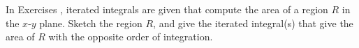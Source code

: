 {\noindent In Exercises}
{, iterated integrals are given that compute the area of a region $R$ in the $x$-$y$ plane. Sketch the region $R$, and give the iterated integral(s) that give the area of $R$ with the opposite order of integration.}

